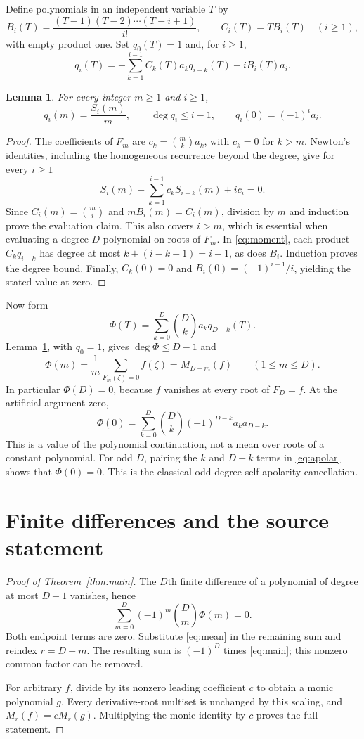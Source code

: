 \documentclass[11pt]{article}
\newtheorem{lemma}[theorem]{Lemma}
\begin{document}
Define polynomials in an independent variable $T$ by
\[
 B_i(T)=\frac{(T-1)(T-2)\cdots(T-i+1)}{i!},\qquad
 C_i(T)=T B_i(T)\quad(i\geq1),
\]
with empty product one. Set $q_0(T)=1$ and, for $i\geq1$,
\begin{equation}\label{eq:moment}
 q_i(T)=-\sum_{k=1}^{i-1}C_k(T)a_k q_{i-k}(T)-iB_i(T)a_i.
\end{equation}

\begin{lemma}\label{lem:moment}
For every integer $m\geq1$ and $i\geq1$,
\[
 q_i(m)=\frac{S_i(m)}m,\qquad
 \deg q_i\leq i-1,\qquad q_i(0)=(-1)^i a_i.
\]
\end{lemma}
\begin{proof}
The coefficients of $F_m$ are $c_k=\binom mk a_k$, with $c_k=0$ for
$k>m$. Newton's identities, including the homogeneous recurrence beyond
the degree, give for every $i\geq1$
\[
 S_i(m)+\sum_{k=1}^{i-1}c_k S_{i-k}(m)+i c_i=0.
\]
Since $C_i(m)=\binom mi$ and $mB_i(m)=C_i(m)$, division by $m$ and
induction prove the evaluation claim. This also covers $i>m$, which is
essential when evaluating a degree-$D$ polynomial on roots of $F_m$.
In \eqref{eq:moment}, each product $C_kq_{i-k}$ has degree at most
$k+(i-k-1)=i-1$, as does $B_i$. Induction proves the degree bound.
Finally, $C_k(0)=0$ and $B_i(0)=(-1)^{i-1}/i$, yielding the stated value
at zero.
\end{proof}

Now form
\[
 \Phi(T)=\sum_{k=0}^D\binom Dk a_k q_{D-k}(T).
\]
Lemma~\ref{lem:moment}, with $q_0=1$, gives $\deg\Phi\leq D-1$ and
\begin{equation}\label{eq:mean}
 \Phi(m)=\frac1m\sum_{F_m(\zeta)=0}f(\zeta)=M_{D-m}(f)
       \qquad(1\leq m\leq D).
\end{equation}
In particular $\Phi(D)=0$, because $f$ vanishes at every root of $F_D=f$.
At the artificial argument zero,
\begin{equation}\label{eq:apolar}
 \Phi(0)=\sum_{k=0}^D\binom Dk(-1)^{D-k}a_k a_{D-k}.
\end{equation}
This is a value of the polynomial continuation, not a mean over roots
of a constant polynomial. For odd $D$, pairing the $k$ and $D-k$ terms
in \eqref{eq:apolar} shows that $\Phi(0)=0$. This is the classical
odd-degree self-apolarity cancellation.

\section{Finite differences and the source statement}
\begin{proof}[Proof of Theorem~\ref{thm:main}]
The $D$th finite difference of a polynomial of degree at most $D-1$
vanishes, hence
\[
 \sum_{m=0}^D(-1)^m\binom Dm\Phi(m)=0.
\]
Both endpoint terms are zero. Substitute \eqref{eq:mean} in the remaining
sum and reindex $r=D-m$. The resulting sum is
$(-1)^D$ times \eqref{eq:main}; this nonzero common factor can be removed.

For arbitrary $f$, divide by its nonzero leading coefficient $c$ to
obtain a monic polynomial $g$. Every derivative-root multiset is
unchanged by this scaling, and $M_r(f)=cM_r(g)$. Multiplying the monic
identity by $c$ proves the full statement.
\end{proof}
\end{document}
